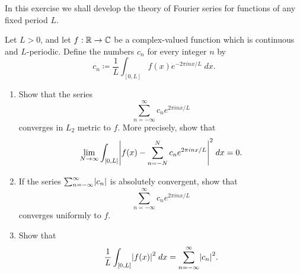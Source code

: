\begin{ex}\label{ex:5.5.6}
  In this exercise we shall develop the theory of Fourier series for functions of any fixed period \(L\).

  Let \(L > 0\), and let \(f : \mathbb{R} \to \mathbb{C}\) be a complex-valued function which is continuous and \(L\)-periodic.
  Define the numbers \(c_n\) for every integer \(n\) by
  \[
    c_n \coloneqq \dfrac{1}{L} \int_{[0, L]} f(x) e^{- 2 \pi i n x / L} \; dx.
  \]
  \begin{enumerate}
    \item Show that the series
          \[
            \sum_{n = -\infty}^\infty c_n e^{2 \pi i n x / L}
          \]
          converges in \(L_2\) metric to \(f\).
          More precisely, show that
          \[
            \lim_{N \to \infty} \int_{[0, L]} \abs{f(x) - \sum_{n = -N}^N c_n e^{2 \pi i n x / L}}^2 \; dx = 0.
          \]
    \item If the series \(\sum_{n = -\infty}^\infty \abs{c_n}\) is absolutely convergent, show that
          \[
            \sum_{n = -\infty}^\infty c_n e^{2 \pi i n x / L}
          \]
          converges uniformly to \(f\).
    \item Show that
          \[
            \dfrac{1}{L} \int_{[0, L]} \abs{f(x)}^2 \; dx = \sum_{n = -\infty}^\infty \abs{c_n}^2.
          \]
  \end{enumerate}
\end{ex}